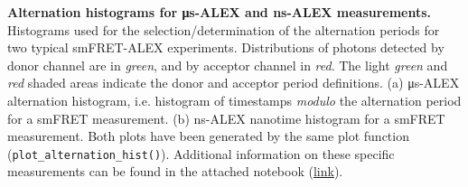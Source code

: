 \label{fig:altern_hist_double} \textbf{Alternation histograms for μs-ALEX and ns-ALEX measurements.}
Histograms used for the selection/determination
of the alternation periods for two typical smFRET-ALEX experiments.
Distributions of photons detected by donor channel are in \textit{green}, and by acceptor channel in \textit{red}.
The light \textit{green} and \textit{red} shaded areas indicate the donor and acceptor period definitions.
(a) μs-ALEX alternation histogram, i.e. histogram of timestamps \textit{modulo} the alternation period for a smFRET measurement. 
(b) ns-ALEX nanotime histogram for a smFRET measurement.
Both plots have been generated by the same plot function (\texttt{plot\_alternation\_hist()}).
Additional information on these specific measurements can be found in the attached notebook
(\href{http://nbviewer.jupyter.org/github/tritemio/fretbursts_paper/blob/master/notebooks/Figures\%20-\%20ALEX\%20histograms.ipynb}{link}).
